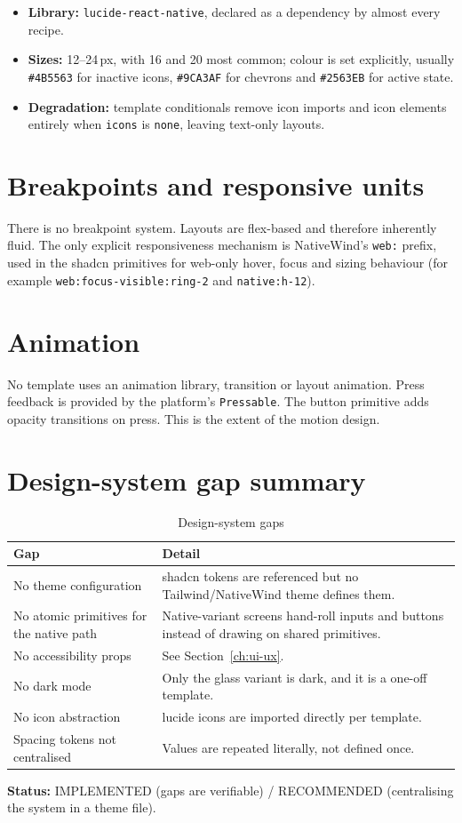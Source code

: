 \begin{itemize}
  \item \textbf{Library:} \texttt{lucide-react-native}, declared as a dependency by
        almost every recipe.
  \item \textbf{Sizes:} 12--24\,px, with 16 and 20 most common; colour is set
        explicitly, usually \texttt{\#4B5563} for inactive icons, \texttt{\#9CA3AF}
        for chevrons and \texttt{\#2563EB} for active state.
  \item \textbf{Degradation:} template conditionals remove icon imports and icon
        elements entirely when \texttt{icons} is \texttt{none}, leaving text-only
        layouts.
\end{itemize}

\section{Breakpoints and responsive units}

There is no breakpoint system. Layouts are flex-based and therefore inherently
fluid. The only explicit responsiveness mechanism is NativeWind's \texttt{web:}
prefix, used in the shadcn primitives for web-only hover, focus and sizing
behaviour (for example \texttt{web:focus-visible:ring-2} and
\texttt{native:h-12}).

\section{Animation}

No template uses an animation library, transition or layout animation. Press
feedback is provided by the platform's \texttt{Pressable}. The button primitive
adds opacity transitions on press. This is the extent of the motion design.

\section{Design-system gap summary}

\begin{table}[H]
\centering
\caption{Design-system gaps}
\begin{tabular}{@{}L{4.6cm}L{9.2cm}@{}}
\toprule
\textbf{Gap} & \textbf{Detail} \\
\midrule
No theme configuration & shadcn tokens are referenced but no Tailwind/NativeWind
theme defines them. \\
No atomic primitives for the native path & Native-variant screens hand-roll inputs
and buttons instead of drawing on shared primitives. \\
No accessibility props & See Section~\ref{ch:ui-ux}. \\
No dark mode & Only the glass variant is dark, and it is a one-off template. \\
No icon abstraction & lucide icons are imported directly per template. \\
Spacing tokens not centralised & Values are repeated literally, not defined once. \\
\bottomrule
\end{tabular}
\end{table}

\textbf{Status:} IMPLEMENTED (gaps are verifiable) / RECOMMENDED (centralising the
system in a theme file).

